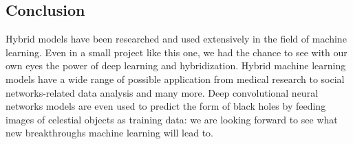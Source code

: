 \documentclass[10pt,a4paper]{article}
\begin{document}
	\subsection{Conclusion}
	Hybrid models have been researched and used extensively in the field of machine learning. Even in a small project like this one, we had the chance to see with our own eyes the power of deep learning and hybridization. Hybrid machine learning models have a wide range of possible application from medical research to social networks-related data analysis and many more. Deep convolutional neural networks models are even used to predict the form of black holes by feeding images of celestial objects as training data\cite{DBLP:journals/corr/GeorgeH17}: we are looking forward to see what new breakthroughs machine learning will lead to.
		\begin{figure}
		\centering
		

\end{figure}
\end{document}
